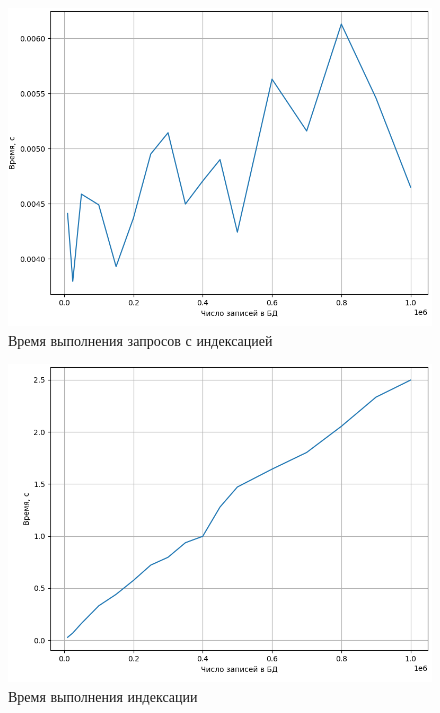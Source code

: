 \begin{figure}[H]
	\begin{center}
		\includegraphics[page=1,scale=0.8]{assets/indexing_separate_username.png}
	\end{center}
	\caption{Время выполнения запросов с индексацией}
	\label{indexing_both_username}
\end{figure}


\begin{figure}[H]
	\begin{center}
		\includegraphics[page=1,scale=0.8]{assets/indexing_time_username.png}
	\end{center}
	\caption{Время выполнения индексации}
	\label{indexing_time_username}
\end{figure}

